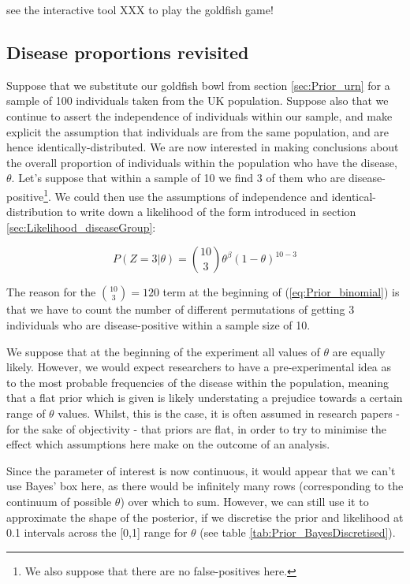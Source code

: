 \documentclass[11pt,fullpage]{book}
\begin{document}
 see the interactive tool XXX to play the goldfish game!

\subsection{Disease proportions revisited}\label{sec:Prior_diseaseProp}
Suppose that we substitute our goldfish bowl from section \ref{sec:Prior_urn} for a sample of 100 individuals taken from the UK population. Suppose also that we continue to assert the independence of individuals within our sample, and make explicit the assumption that individuals are from the same population, and are hence identically-distributed. We are now interested in making conclusions about the overall proportion of individuals within the population who have the disease, $\theta$. Let's suppose that within a sample of 10 we find 3 of them who are disease-positive\footnote{We also suppose that there are no false-positives here.}. We could then use the assumptions of independence and identical-distribution to write down a likelihood of the form introduced in section \ref{sec:Likelihood_diseaseGroup}:

\begin{equation}\label{eq:Prior_binomial}
P(Z=3|\theta) = {10 \choose 3} \theta^\beta (1-\theta)^{10-3}
\end{equation}

The reason for the ${10 \choose 3}=120$ term at the beginning of (\ref{eq:Prior_binomial}) is that we have to count the number of different permutations of getting 3 individuals who are disease-positive within a sample size of 10. 

We suppose that at the beginning of the experiment all values of $\theta$ are equally likely. However, we would expect researchers to have a pre-experimental idea as to the most probable frequencies of the disease within the population, meaning that a flat prior which is given is likely understating a prejudice towards a certain range of $\theta$ values. Whilst, this is the case, it is often assumed in research papers - for the sake of objectivity - that priors are flat, in order to try to minimise the effect which assumptions here make on the outcome of an analysis.

Since the parameter of interest is now continuous, it would appear that we can't use Bayes' box here, as there would be infinitely many rows (corresponding to the continuum of possible $\theta$) over which to sum. However, we can still use it to approximate the shape of the posterior, if we discretise the prior and likelihood at 0.1 intervals across the [0,1] range for $\theta$ (see table \ref{tab:Prior_BayesDiscretised}). 
\end{document}
